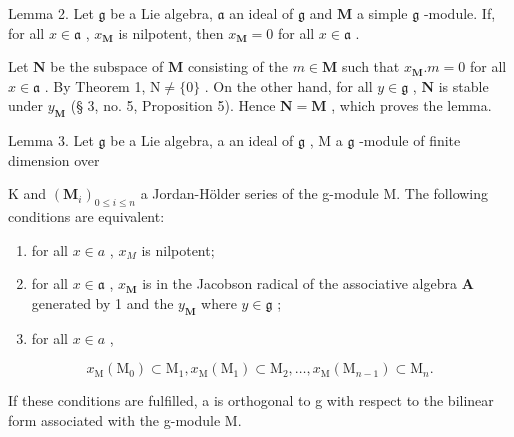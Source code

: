 Lemma 2. Let \(\mathfrak{g}\) be a Lie algebra, \(\mathfrak{a}\) an ideal of \(\mathfrak{g}\) and \(\mathbf{M}\) a simple \(\mathfrak{g}\) -module. If, for all \(x \in \mathfrak{a}\) , \(x_{\mathbf{M}}\) is nilpotent, then \(x_{\mathbf{M}} = 0\) for all \(x \in \mathfrak{a}\) .

Let \(\mathbf{N}\) be the subspace of \(\mathbf{M}\) consisting of the \(m \in \mathbf{M}\) such that \(x_{\mathbf{M}}.m = 0\) for all \(x \in \mathfrak{a}\) . By Theorem 1, \(\mathrm{N} \neq \{0\}\) . On the other hand, for all \(y \in \mathfrak{g}\) , \(\mathbf{N}\) is stable under \(y_{\mathbf{M}}\) (§ 3, no. 5, Proposition 5). Hence \(\mathbf{N} = \mathbf{M}\) , which proves the lemma.

Lemma 3. Let \(\mathfrak{g}\) be a Lie algebra, a an ideal of \(\mathfrak{g}\) , M a \(\mathfrak{g}\) -module of finite dimension over

K and \((\mathbf{M}_{i})_{0\leqslant i\leqslant n}\) a Jordan-Hölder series of the g-module M. The following conditions are equivalent:

\begin{enumerate}
\def\labelenumi{(\alph{enumi})}
\item
  for all \(x \in a\) , \(x_{M}\) is nilpotent;
\item
  for all \(x \in \mathfrak{a}\) , \(x_{\mathbf{M}}\) is in the Jacobson radical of the associative algebra \(\mathbf{A}\) generated by 1 and the \(y_{\mathbf{M}}\) where \(y \in \mathfrak{g}\) ;
\item
  for all \(x \in a\) ,
\end{enumerate}

\[
x _ {\mathrm{M}} \left(\mathrm{M} _ {0}\right) \subset \mathrm{M} _ {1}, x _ {\mathrm{M}} \left(\mathrm{M} _ {1}\right) \subset \mathrm{M} _ {2}, \dots , x _ {\mathrm{M}} \left(\mathrm{M} _ {n - 1}\right) \subset \mathrm{M} _ {n}.
\]

If these conditions are fulfilled, a is orthogonal to g with respect to the bilinear form associated with the g-module M.

